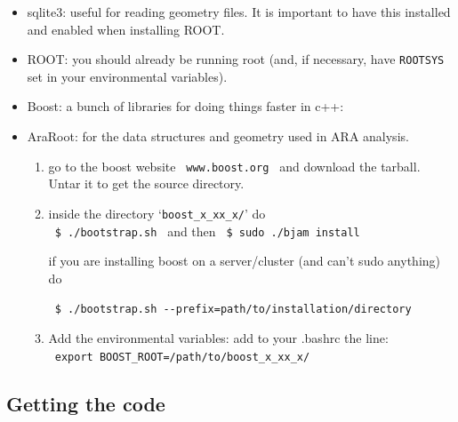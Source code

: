 \documentclass[a4paper,10pt]{article}
\begin{document}
\begin{itemize}

 \item sqlite3: useful for reading geometry files. It is important to have this installed and enabled when installing ROOT. 

 \item ROOT: you should already be running root (and, if necessary, have \verb|ROOTSYS| set in your environmental variables). 

 \item Boost: a bunch of libraries for doing things faster in c++: 
 
 \item AraRoot: for the data structures and geometry used in ARA analysis. 
 
 \begin{enumerate} 
  
  \item go to the boost website \verb| www.boost.org | and download the tarball. Untar it to get the source directory. 
  
  \item inside the directory `\verb|boost_x_xx_x/|' do\\ \verb| $ ./bootstrap.sh | and then \verb| $ sudo ./bjam install| 
  
  if you are installing boost on a server/cluster (and can't sudo anything) do
  
  \verb| $ ./bootstrap.sh --prefix=path/to/installation/directory |
  
  \item Add the environmental variables: add to your .bashrc the line:\\ \verb| export BOOST_ROOT=/path/to/boost_x_xx_x/ |
   
 \end{enumerate}

 \vspace{-0.3cm}
 

\end{itemize}

\subsection{Getting the code}
\end{document}
